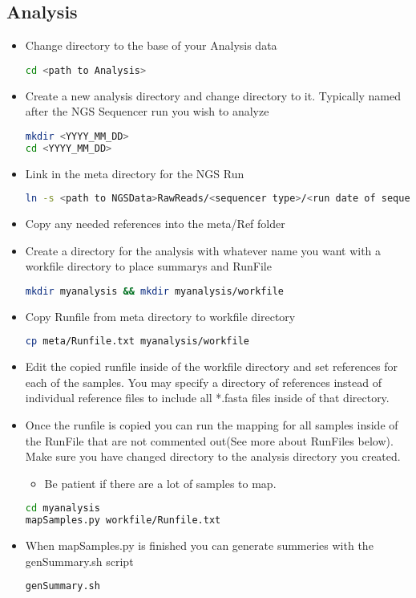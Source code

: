 \documentclass{article}
\begin{document}
\subsection{Analysis}
\begin{itemize}
\item Change directory to the base of your Analysis data
{\tiny
\begin{lstlisting}[language=bash]
cd <path to Analysis>
\end{lstlisting}
}
\item Create a new analysis directory and change directory to it. Typically named after the NGS Sequencer run you wish to analyze
{\tiny
\begin{lstlisting}[language=bash]
mkdir <YYYY_MM_DD>
cd <YYYY_MM_DD>
\end{lstlisting}
}
\item Link in the meta directory for the NGS Run
{\tiny
\begin{lstlisting}[language=bash]
ln -s <path to NGSData>RawReads/<sequencer type>/<run date of sequencer>/meta .
\end{lstlisting}
}
\item Copy any needed references into the meta/Ref folder
\item Create a directory for the analysis with whatever name you want with a workfile directory to place summarys and RunFile
{\tiny
\begin{lstlisting}[language=bash]
mkdir myanalysis && mkdir myanalysis/workfile
\end{lstlisting}
}
\item Copy Runfile from meta directory to workfile directory
{\tiny
\begin{lstlisting}[language=bash]
cp meta/Runfile.txt myanalysis/workfile
\end{lstlisting}
}
\item Edit the copied runfile inside of the workfile directory and set references for each of the samples. You may specify a directory of references instead of individual reference files to include all *.fasta files inside of that directory.
\item Once the runfile is copied you can run the mapping for all samples inside of the RunFile that are not commented out(See more about RunFiles below). Make sure you have changed directory to the analysis directory you created.
  \begin{itemize}
   \item Be patient if there are a lot of samples to map.
  \end{itemize}
{\tiny
\begin{lstlisting}[language=bash]
cd myanalysis
mapSamples.py workfile/Runfile.txt
\end{lstlisting}
}
\item When mapSamples.py is finished you can generate summeries with the genSummary.sh script
{\tiny
\begin{lstlisting}[language=bash]
genSummary.sh
\end{lstlisting}
}
\end{itemize}
\end{document}
